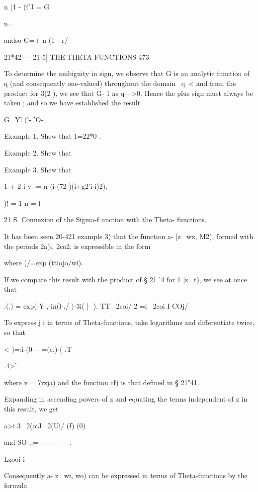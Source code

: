n (1 - (f'J = G\ 



n=\ 



andso G=+ n (1 - r/  



21*42 — 21-5] THE THETA FUNCTIONS 473 

To determine the ambiguity in sign, we observe that G is an analytic 
function of q (and consequently one-valued) throughout the domain \ q\ < \; 
and from the product for  3(2 ), we see that G- 1 as q—>0. Hence the 
plus sign must always be taken ; and so we have established the result 

G=Yl (l- 'O- 

Example 1. Shew that  1=22*0 . 

Example 2. Shew that 

Example 3. Shew that 

1 + 2 i y -= n  (i-(72 )(i+g2'i-i)2). 

)! = 1 n = l 

21  S. Connexion of the Sigma-f unction with the Theta- functions. 

It has been seen    20-421 example 3) that the function a- [z \ wx, M2), formed with 
the periods 2a)i, 2co2, is expressible in the form 

where (/=exp (ttiojo/wi). 

If we compare this result with the product of § 21 '4 for  1 [z \ t), we see at once that 

.(.) =  exp( Y ,-in(l-./ )-3i( |- ). 
TT \ 2coi/ 2  =i   \ 2coi I COj/ 

To express j i in terms of Theta-functious, take logarithms and differentiate twice, 
so that 



 < )=:i-(0— =(e,)-( .T 






.4>' 

where v =  7rzja)  and the function cf) is that defined in § 21"41. 

Expanding in ascending powers of z and equating the terms independent of z in this 
result, we get 



a>i 3 \ 2(oiJ \ 2(Ui/ (f) (0) 

and SO ,;=\ —— -— . 

Lzooi  i 

Consequently a-  z \ wi, wo) can be expressed in terms of Theta-functions by the 
formula 

